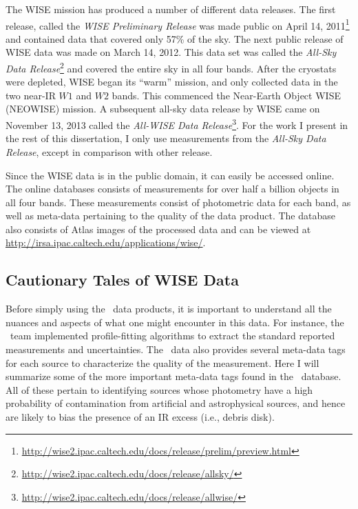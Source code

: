     The WISE mission has produced a number of different data releases. The first release, called the \textit{WISE Preliminary Release} was made public on April 14, 2011\footnote{\url{http://wise2.ipac.caltech.edu/docs/release/prelim/preview.html}} and contained data that covered only 57\% of the sky. The next public release of WISE data was made on March 14, 2012. This data set was called the \textit{All-Sky Data Release}\footnote{\url{http://wise2.ipac.caltech.edu/docs/release/allsky/}} and covered the entire sky in all four bands. After the cryostats were depleted, WISE began its ``warm'' mission, and only collected data in the two near-IR $W1$ and $W2$ bands. This commenced the Near-Earth Object WISE (NEOWISE) mission. A subsequent all-sky data release by WISE came on November 13, 2013 called the \textit{All-WISE Data Release}\footnote{\url{http://wise2.ipac.caltech.edu/docs/release/allwise/}}. For the work I present in the rest of this dissertation, I only use measurements from the \textit{All-Sky Data Release}, except in comparison with other release. 
    
    Since the WISE data is in the public domain, it can easily be accessed online. The online databases consists of measurements for over half a billion objects in all four bands. These measurements consist of photometric data for each band, as well as meta-data pertaining to the quality of the data product. The database also consists of Atlas images of the processed data and can be viewed at \url{http://irsa.ipac.caltech.edu/applications/wise/}. 
    
    \subsection{Cautionary Tales of WISE Data}\label{sec:bad_wise}
    
    Before simply using the \WS\ data products, it is important to understand all the nuances and aspects of what one might encounter in this data. For instance, the \WS\ team implemented profile-fitting algorithms to extract the standard reported measurements and uncertainties. The \WS\ data also provides several meta-data tags for each source to characterize the quality of the measurement. Here I will summarize some of the more important meta-data tags found in the \WS\ database. All of these pertain to identifying sources whose photometry have a high probability of contamination from artificial and astrophysical sources, and hence are likely to bias the presence of an IR excess (i.e., debris disk).
    
